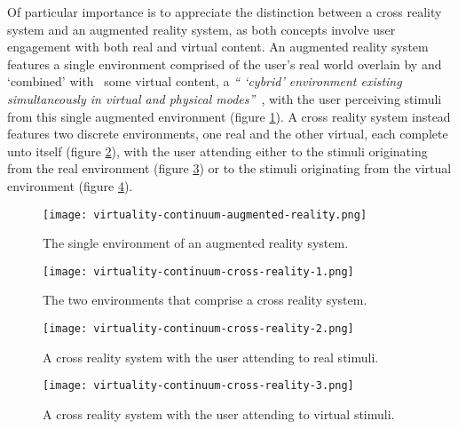 Of particular importance is to appreciate the distinction between a cross reality system and an augmented reality system\avxrfootnote{}, as both concepts involve user engagement with both real and virtual content. An augmented reality system features a single environment comprised of the user's real world overlain by and `combined' with~\cite{Billinghurst2014} some virtual content, a \textit{`` `cybrid' environment existing simultaneously in virtual and physical modes''}~\cite{Lichty2014}, with the user perceiving stimuli from this single augmented environment (figure \ref{virtuality-continuum-augmented-reality}). A cross reality system instead features two discrete environments, one real and the other virtual, each complete unto itself (figure \ref{virtuality-continuum-cross-reality-1}), with the user attending either to the stimuli originating from the real environment (figure \ref{virtuality-continuum-cross-reality-2}) or to the stimuli originating from the virtual environment (figure \ref{virtuality-continuum-cross-reality-3}).

\begin{figure}
	\begin{center}
		\texttt{[image: virtuality-continuum-augmented-reality.png]}
		\caption{The single environment of an augmented reality system.}
		\label{virtuality-continuum-augmented-reality}
	\end{center}
\end{figure}

\begin{figure}
	\begin{center}
		\texttt{[image: virtuality-continuum-cross-reality-1.png]}
		\caption{The two environments that comprise a cross reality system.}
		\label{virtuality-continuum-cross-reality-1}
	\end{center}
\end{figure}

\begin{figure}[h]
	\begin{center}
		\texttt{[image: virtuality-continuum-cross-reality-2.png]}
		\caption{A cross reality system with the user attending to real stimuli.}
		\label{virtuality-continuum-cross-reality-2}
	\end{center}
\end{figure}

\begin{figure}
	\begin{center}
		\texttt{[image: virtuality-continuum-cross-reality-3.png]}
		\caption{A cross reality system with the user attending to virtual stimuli.}
		\label{virtuality-continuum-cross-reality-3}
	\end{center}
\end{figure}

